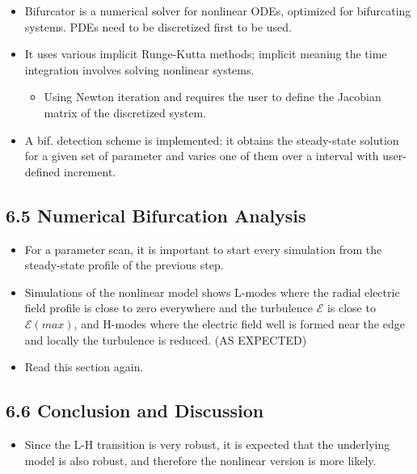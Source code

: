 \documentclass[a4paper]{article}
\begin{document}
\begin{itemize}
\item
  Bifurcator is a numerical solver for nonlinear ODEs, optimized for
  bifurcating systems. PDEs need to be discretized first to be used.
\item
  It uses various implicit Runge-Kutta methods; implicit meaning the
  time integration involves solving nonlinear systems.

  \begin{itemize}
  \itemsep1pt\parskip0pt
  \item
    Using Newton iteration and requires the user to define the Jacobian
    matrix of the discretized system.
  \end{itemize}
\item
  A bif. detection scheme is implemented: it obtains the steady-state
  solution for a given set of parameter and varies one of them over a
  interval with user-defined increment.
\end{itemize}

\subsection{6.5 Numerical Bifurcation
Analysis}\label{numerical-bifurcation-analysis}

\begin{itemize}
\item
  For a parameter scan, it is important to start every simulation from
  the steady-state profile of the previous step.
\item
  Simulations of the nonlinear model shows L-modes where the radial
  electric field profile is close to zero everywhere and the turbulence
  $\mathcal{E}$ is close to $\mathcal{E}(max)$, and H-modes where the
  electric field well is formed near the edge and locally the turbulence
  is reduced. (AS EXPECTED)
\item
  Read this section again.
\end{itemize}

\subsection{6.6 Conclusion and
Discussion}\label{conclusion-and-discussion-2}

\begin{itemize}
\itemsep1pt\parskip0pt
\item
  Since the L-H transition is very robust, it is expected that the
  underlying model is also robust, and therefore the nonlinear version
  is more likely.
\end{itemize}
\end{document}
